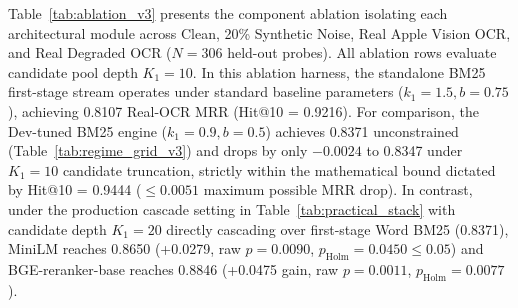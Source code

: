 Table~\ref{tab:ablation_v3} presents the component ablation isolating each architectural module across Clean, 20\% Synthetic Noise, Real Apple Vision OCR, and Real Degraded OCR ($N=306$ held-out probes). All ablation rows evaluate candidate pool depth $K_1=10$. In this ablation harness, the standalone BM25 first-stage stream operates under standard baseline parameters ($k_1=1.5, b=0.75$), achieving 0.8107 Real-OCR MRR (Hit@10 = 0.9216). For comparison, the Dev-tuned BM25 engine ($k_1=0.9, b=0.5$) achieves 0.8371 unconstrained (Table~\ref{tab:regime_grid_v3}) and drops by only $-0.0024$ to 0.8347 under $K_1=10$ candidate truncation, strictly within the mathematical bound dictated by Hit@10 = 0.9444 ($\le 0.0051$ maximum possible MRR drop). In contrast, under the production cascade setting in Table~\ref{tab:practical_stack} with candidate depth $K_1=20$ directly cascading over first-stage Word BM25 (0.8371), MiniLM reaches 0.8650 (+0.0279, raw $p=0.0090$, $p_{\text{Holm}}=0.0450 \le 0.05$) and BGE-reranker-base reaches 0.8846 (+0.0475 gain, raw $p=0.0011$, $p_{\text{Holm}}=0.0077$).

